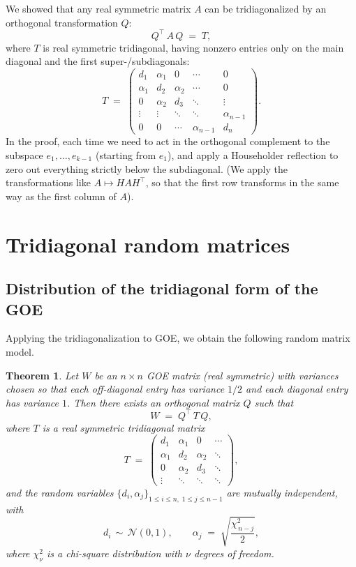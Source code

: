\documentclass[letterpaper,11pt,oneside,reqno]{article}
\numberwithin{equation}{section}
\newtheorem{theorem}[proposition]{Theorem}
\theoremstyle{definition}
\begin{document}
We showed that any real symmetric matrix \(A\) can be tridiagonalized by an orthogonal transformation \(Q\):
\[
	Q^\top\,A\,Q \;=\; T,
\]
where \(T\) is real symmetric tridiagonal, having nonzero entries only on the main diagonal and the first super-/subdiagonals:
\begin{equation*}
	T \;=\;
	\begin{pmatrix}
		 d_1 & \alpha_1 & 0 & \cdots & 0\\
		 \alpha_1 & d_2 & \alpha_2 & \cdots & 0\\
		 0 & \alpha_2 & d_3 & \ddots & \vdots\\
		 \vdots & \vdots & \ddots & \ddots & \alpha_{n-1}\\
		 0 & 0 & \cdots & \alpha_{n-1} & d_n
	\end{pmatrix}.
\end{equation*}
In the proof, each time we need to act in the orthogonal complement to the
subspace $e_1,\ldots,e_{k-1}$ (starting from $e_1$),
and apply a Householder reflection to zero out everything strictly
below the subdiagonal. (We apply the transformations like
$A\mapsto H A H^{\top}$, so that the first row transforms
in the same way as the first column of $A$).

\section{Tridiagonal random matrices}

\subsection{Distribution of the tridiagonal form of the GOE}

Applying the tridiagonalization to GOE, we obtain the following
random matrix model.

\begin{theorem}
\label{thm:DE-model}
Let \(W\) be an \(n\times n\) GOE matrix (real symmetric) with variances chosen so that each off-diagonal entry has variance \(1/2\) and each diagonal entry has variance \(1\).  Then there exists an orthogonal matrix \(Q\) such that
\[
   W \;=\; Q^\top\,T\,Q,
\]
where \(T\) is a real symmetric tridiagonal matrix
\begin{equation}
	\label{eq:tridiagonal-form}
   T \;=\; \begin{pmatrix}
         d_1 & \alpha_1 & 0 & \cdots \\
         \alpha_1 & d_2 & \alpha_2 & \ddots \\
         0 & \alpha_2 & d_3 & \ddots \\
         \vdots & \ddots & \ddots & \ddots
       \end{pmatrix},
\end{equation}
and the random variables \(\{d_i,\alpha_j\}_{1 \le i \le n,\;1\le j\le n-1}\) are mutually independent, with
\[
  d_i \,\sim\, \mathcal{N}(0,1),
  \qquad
  \alpha_j \;=\; \sqrt{\frac{\chi^2_{\,n-j}}{2}},
\]
where \(\chi^2_{\nu}\) is a chi-square distribution with \(\nu\) degrees of freedom.
\end{theorem}
\end{document}
